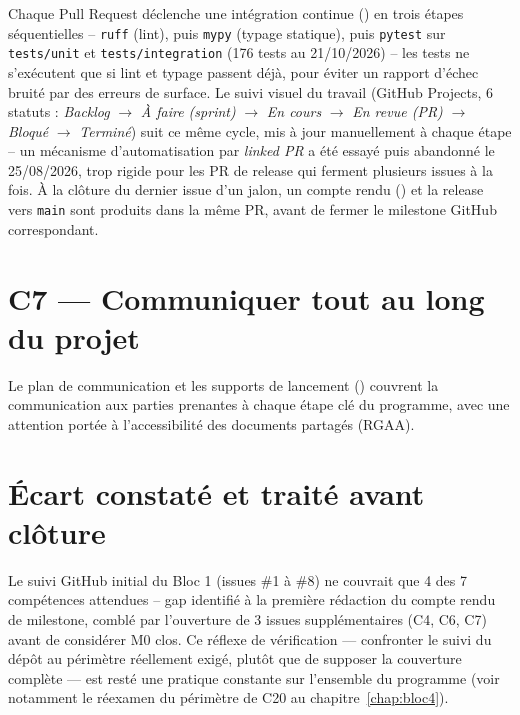 Chaque Pull Request déclenche une intégration continue
() en trois étapes séquentielles --
\texttt{ruff} (lint), puis \texttt{mypy} (typage statique), puis
\texttt{pytest} sur \texttt{tests/unit} et \texttt{tests/integration}
(176 tests au 21/10/2026) -- les tests ne s'exécutent que si lint et
typage passent déjà, pour éviter un rapport d'échec bruité par des
erreurs de surface. Le suivi visuel du travail (GitHub Projects,
6 statuts : \textit{Backlog} $\rightarrow$ \textit{À faire (sprint)}
$\rightarrow$ \textit{En cours} $\rightarrow$ \textit{En revue (PR)}
$\rightarrow$ \textit{Bloqué} $\rightarrow$ \textit{Terminé}) suit ce
même cycle, mis à jour manuellement à chaque étape -- un mécanisme
d'automatisation par \textit{linked PR} a été essayé puis abandonné le
25/08/2026, trop rigide pour les PR de release qui ferment plusieurs
issues à la fois. À la clôture du dernier issue d'un jalon, un compte
rendu () et la release vers
\texttt{main} sont produits dans la même PR, avant de fermer le
milestone GitHub correspondant.

\section{C7 --- Communiquer tout au long du projet}

Le plan de communication et les supports de lancement
() couvrent la
communication aux parties prenantes à chaque étape clé du programme,
avec une attention portée à l'accessibilité des documents partagés
(RGAA).

\section{Écart constaté et traité avant clôture}

Le suivi GitHub initial du Bloc 1 (issues \#1 à \#8) ne couvrait que 4
des 7 compétences attendues -- gap identifié à la première rédaction
du compte rendu de milestone, comblé par l'ouverture de 3 issues
supplémentaires (C4, C6, C7) avant de considérer M0 clos. Ce réflexe de
vérification --- confronter le suivi du dépôt au périmètre réellement
exigé, plutôt que de supposer la couverture complète --- est resté une
pratique constante sur l'ensemble du programme (voir notamment le
réexamen du périmètre de C20 au chapitre~\ref{chap:bloc4}).
